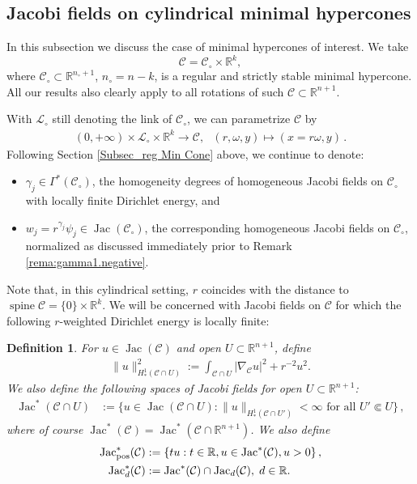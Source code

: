 \documentclass[11pt, letterpaper, reqno]{amsart}
\numberwithin{equation}{section}
\newtheorem{Def}{Definition}[section]
\theoremstyle{remark}
\newcommand{\RR}{\mathbb{R}}
\newcommand{\cC}{\mathcal{C}}
\newcommand{\cL}{\mathcal{L}}
\newcommand{\Jac}{\operatorname{Jac}}
\newcommand{\spine}{\operatorname{spine}}
\begin{document}
\subsection{Jacobi fields on cylindrical minimal hypercones} \label{Subsec_Cylind Min Cone} 
  
In this subsection we discuss the case of minimal hypercones of interest. We take
\[ \cC = \cC_\circ \times \RR^k, \]
where $\cC_\circ \subset \RR^{n_\circ+1}$, $n_\circ = n - k$, is a regular and strictly stable minimal hypercone. All our results also clearly apply to all rotations of such $\cC \subset \RR^{n+1}$.

With $\cL_\circ$ still denoting the link of $\cC_\circ$, we can parametrize $\cC$ by 
    \begin{align}
       (0, +\infty)\times \cL_\circ \times \RR^k \to \cC,\ \ \ (r, \omega, y)\mapsto (x = r\omega, y)\,. \label{Equ_Parametrize minimal hypercone}
    \end{align}
Following Section \ref{Subsec_reg Min Cone} above, we continue to denote:
\begin{itemize}
	\item $\gamma_j \in \Gamma^*(\cC_\circ)$, the homogeneity degrees of homogeneous Jacobi fields on $\cC_\circ$ with locally finite Dirichlet energy, and
	\item $w_j = r^{\gamma_j} \psi_j \in \Jac(\cC_\circ)$, the corresponding homogeneous Jacobi fields on $\cC_\circ$, normalized as discussed immediately prior to Remark \ref{rema:gamma1.negative}.
\end{itemize}
Note that, in this cylindrical setting, $r$ coincides with the distance to $\spine \cC = \{ 0 \} \times \RR^k$. We will be concerned with Jacobi fields on $\cC$ for which the following $r$-weighted Dirichlet energy is locally finite:

\begin{Def} \label{defi:cylindrical.energies}
For $u\in \Jac(\cC)$ and open $U\subset \RR^{n+1}$, define 
    \begin{align*}
      \|u\|_{H^1_*(\cC \cap U)}^2 := \int_{\cC \cap U} |\nabla_\cC u|^2 + r^{-2}u^2.
    \end{align*}
    We also define the following spaces of Jacobi fields for open $U \subset \RR^{n+1}$:
      \begin{align*}
      \Jac^*(\cC \cap U) & := \{u\in \Jac(\cC \cap U): \|u\|_{H^1_*(\cC \cap U')}< \infty \text{ for all } U' \Subset U \} \,,
      \end{align*}
      where of course $\Jac^*(\cC) = \Jac^*(\cC \cap \RR^{n+1})$. We also define
      \begin{align*}
      \Jac^*_\textnormal{pos}(\cC) & := \{ t u : t \in \RR, u \in \Jac^*(\cC), u > 0 \} \,, \\
      \Jac^*_d(\cC) & := \Jac^*(\cC) \cap \Jac_d(\cC), \; d \in \RR.
    \end{align*}
\end{Def}
\end{document}
